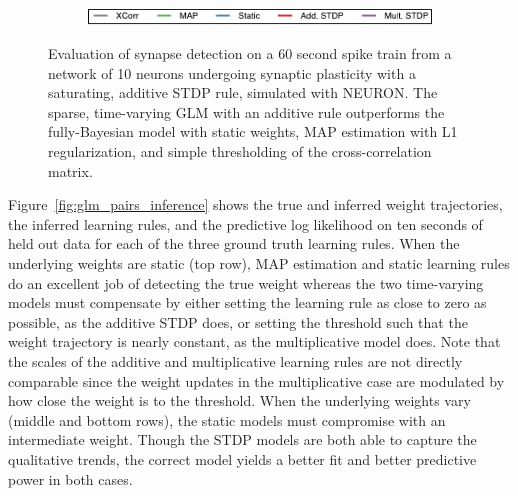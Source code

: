 \begin{figure}[t!]
\begin{subfigure}[T]{\textwidth}
  \centering
  \includegraphics[height=1.25em]{figures/ch4/fig5_legend}    
  \end{subfigure}
  \caption[Dynamic link prediction on data generated from NEURON]{
    Evaluation of synapse detection on a 60 second spike train
    from a network of 10 neurons undergoing synaptic plasticity with a
    saturating, additive STDP rule, simulated with NEURON. The sparse,
    time-varying GLM with an additive rule outperforms the
    fully-Bayesian model with static weights, MAP estimation with L1
    regularization, and simple thresholding of the cross-correlation
    matrix. }
  \label{fig:pynn_roc}
  \vspace{-1em}
\end{figure}

Figure~\ref{fig:glm_pairs_inference} shows the true and inferred
weight trajectories, the inferred learning rules, and the predictive
log likelihood on ten seconds of held out data for each of the three
ground truth learning rules. When the underlying weights are static
(top row), MAP estimation and static learning rules do an excellent
job of detecting the true weight whereas the two time-varying models
must compensate by either setting the learning rule as close to zero
as possible, as the additive STDP does, or setting the threshold such
that the weight trajectory is nearly constant, as the multiplicative
model does. Note that the scales of the additive and multiplicative
learning rules are not directly comparable since the weight updates in
the multiplicative case are modulated by how close the weight is to
the threshold. When the underlying weights vary (middle and bottom
rows), the static models must compromise with an intermediate
weight. Though the STDP models are both able to capture the
qualitative trends, the correct model yields a better fit and better
predictive power in both cases.

